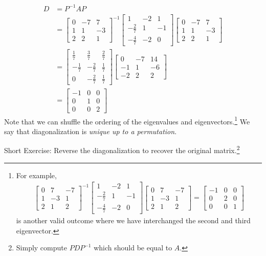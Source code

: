 \begin{solution}
\begin{align*}
D &= P^{-1}AP \\
&=
\begin{bmatrix}
0 & -7 & 7\\ 
1 & 1 & -3\\ 
2 & 2 & 1
\end{bmatrix}^{-1}
\begin{bmatrix}
1 & -2 & 1 \\ 
-\frac{2}{7} & 1 & -1 \\ 
-\frac{4}{7} & -2 & 0
\end{bmatrix}
\begin{bmatrix}
0 & -7 & 7\\ 
1 & 1 & -3\\ 
2 & 2 & 1
\end{bmatrix} \\
&=
\begin{bmatrix}
\frac{1}{7}&\frac{3}{7}&\frac{2}{7}\\ 
-\frac{1}{7}&-\frac{2}{7}&\frac{1}{7}\\ 
0&-\frac{2}{7}&\frac{1}{7}
\end{bmatrix}
\begin{bmatrix}
0&-7&14\\ 
-1&1&-6\\ 
-2&2&2
\end{bmatrix} \\
&=
\begin{bmatrix}
-1 & 0 & 0 \\
0 & 1 & 0 \\
0 & 0 & 2
\end{bmatrix}
\end{align*}
Note that we can shuffle the ordering of the eigenvalues and eigenvectors.\footnote{For example, \begin{align*}
\begin{bmatrix}
0 & 7 & -7 \\ 
1 & -3 & 1 \\ 
2 & 1 & 2 
\end{bmatrix}^{-1}
\begin{bmatrix}
1 & -2 & 1 \\ 
-\frac{2}{7} & 1 & -1 \\ 
-\frac{4}{7} & -2 & 0
\end{bmatrix}
\begin{bmatrix}
0 & 7 & -7 \\ 
1 & -3 & 1 \\ 
2 & 1 & 2 
\end{bmatrix} 
=
\begin{bmatrix}
-1 & 0 & 0 \\
0 & 2 & 0 \\
0 & 0 & 1
\end{bmatrix}
\end{align*} is another valid outcome where we have interchanged the second and third eigenvector.} We say that diagonalization is \textit{unique up to a permutation}.
\end{solution}
Short Exercise: Reverse the diagonalization to recover the original matrix.\footnote{Simply compute $PDP^{-1}$ which should be equal to $A$.}

